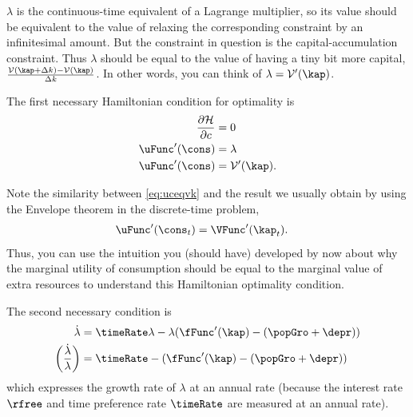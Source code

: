 \documentclass{handout}
\begin{document}
$\lambda$ is the continuous-time equivalent of a Lagrange 
multiplier, so its value should be equivalent to the value of relaxing 
the corresponding constraint by an infinitesimal amount.  But the 
constraint in question is the capital-accumulation constraint.  Thus 
$\lambda$ should be equal to the value of having a tiny bit more 
capital, $\frac{\mathcal{V}(\kap+\Delta k)-\mathcal{V}(\kap)}{\Delta k}$.  In other words, 
you can think of $\lambda=\mathcal{V}'(\kap)$.

The first necessary Hamiltonian condition for optimality is
\begin{equation}\begin{gathered}\begin{aligned}
        \frac{\partial \mathcal{H}}{\partial c} & =  0  \\
        \uFunc^{\prime}(\cons) & =  \lambda %
\\  \uFunc^{\prime}(\cons) & =  \mathcal{V}'(\kap) \label{eq:uceqvk}.
\end{aligned}\end{gathered}\end{equation}

Note the similarity between \eqref{eq:uceqvk} and the result we 
usually obtain by using the Envelope theorem in the discrete-time 
problem,
\begin{equation}\begin{gathered}\begin{aligned}
        \uFunc^{\prime}(\cons_{t}) & =  \VFunc^{\prime}(\kap_{t})
.
\end{aligned}\end{gathered}\end{equation}
Thus, you can use the intuition you (should have) developed by now 
about why the marginal utility of consumption should be equal to the 
marginal value of extra resources to understand this Hamiltonian optimality
condition.

The second necessary condition is
\begin{equation}\begin{gathered}\begin{aligned}
        \dot{\lambda} & =  \timeRate\lambda - \lambda(\fFunc^{\prime}(\kap)-(\popGro+\depr)) %
\\      \left(\frac{\dot{\lambda}}{\lambda}\right) & =  \timeRate-(\fFunc^{\prime}(\kap)-(\popGro+\depr))      \label{eq:lamgrow}      
\end{aligned}\end{gathered}\end{equation}
which expresses the growth rate of $\lambda$ at an annual rate (because
the interest rate $\rfree$ and time preference rate $\timeRate$ are measured at an annual rate).
\end{document}
